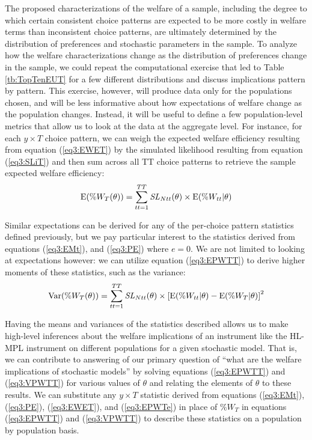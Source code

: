 \documentclass[../main.tex]{subfiles}
\begin{document}
The proposed characterizations of the welfare of a sample, including the degree to which certain consistent choice patterns are expected to be more costly in welfare terms than inconsistent choice patterns, are ultimately determined by the distribution of preferences and stochastic parameters in the sample.
To analyze how the welfare characterizations change as the distribution of preferences change in the sample, we could repeat the computational exercise that led to Table \ref{tb:TopTenEUT} for a few different distributions and discuss implications pattern by pattern.
This exercise, however, will produce data only for the populations chosen, and will be less informative about how expectations of welfare change as the population changes.
Instead, it will be useful to define a few population-level metrics that allow us to look at the data at the aggregate level.
For instance, for each $y \times T$ choice pattern, we can weigh the expected welfare efficiency resulting from equation (\ref{eq3:EWET}) by the simulated likelihood resulting from equation (\ref{eq3:SLiT}) and then sum across all TT choice patterns to retrieve the sample expected welfare efficiency:
\begin{equation}
	\label{eq3:EPWTT}
	\operatorname{E}(\%W_T(\theta)) = \sum_{tt=1}^{TT} \mathit{SL}_{Ntt}(\theta) \times \operatorname{E}(\%W_{tt} | \theta)
\end{equation}

Similar expectations can be derived for any of the per-choice pattern statistics defined previously, but we pay particular interest to the statistics derived from equations (\ref{eq3:EMt}), and (\ref{eq3:PE}) where $e=0$.
We are not limited to looking at expectations however: we can utilize equation (\ref{eq3:EPWTT}) to derive higher moments of these statistics, such as the variance:
\begin{equation}
	\label{eq3:VPWTT}
	\operatorname{Var}(\%W_T(\theta)) = \sum_{tt=1}^{TT} \mathit{SL}_{Ntt}(\theta) \times \left[ \operatorname{E}(\%W_{tt} | \theta) - \operatorname{E}(\%W_T | \theta) \right]^2
\end{equation}

Having the means and variances of the statistics described allows us to make high-level inferences about the welfare implications of an instrument like the HL-MPL instrument on different populations for a given stochastic model.
That is, we can contribute to answering of our primary question of \enquote{what are the welfare implications of stochastic models} by solving equations (\ref{eq3:EPWTT}) and (\ref{eq3:VPWTT}) for various values of $\theta$ and relating the elements of $\theta$ to these results.
We can substitute any  $y \times T$ statistic derived from equations (\ref{eq3:EMt}), (\ref{eq3:PE}), (\ref{eq3:EWET}), and (\ref{eq3:EPWTe}) in place of $\%W_T$ in equations (\ref{eq3:EPWTT}) and (\ref{eq3:VPWTT}) to describe these statistics on a population by population basis.
\end{document}

